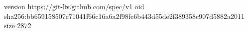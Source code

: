 version https://git-lfs.github.com/spec/v1
oid sha256:bb659158507c71041f66c16a6a2f98fe6b443d55de2f389358c907d5882a2011
size 2872
